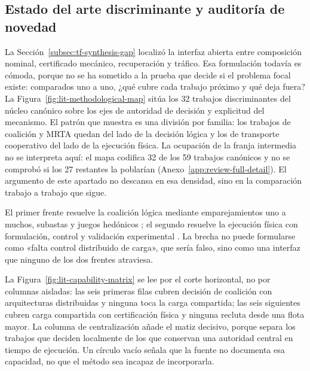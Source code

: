 \subsection{Estado del arte discriminante y auditoría de novedad}
\label{subsec:tf-discriminant}

La Sección~\ref{subsec:tf-synthesis-gap} localizó la interfaz abierta entre composición
nominal, certificado mecánico, recuperación y tráfico. Esa formulación todavía es
cómoda, porque no se ha sometido a la prueba que decide si el problema focal existe:
comparados uno a uno, ¿qué cubre cada trabajo próximo y qué deja fuera? La
Figura~\ref{fig:lit-methodological-map} sitúa los 32 trabajos discriminantes del núcleo
canónico sobre los ejes de autoridad de decisión y explicitud del mecanismo. El patrón
que muestra es una división por familia: los trabajos de coalición y MRTA quedan del
lado de la decisión lógica y los de transporte cooperativo del lado de la ejecución
física. La ocupación de la franja intermedia no se interpreta aquí: el mapa codifica
32 de los 59 trabajos canónicos y no se comprobó si los 27 restantes la poblarían
(Anexo~\ref{app:review-full-detail}). El argumento de este apartado no descansa en esa
densidad, sino en la comparación trabajo a trabajo que sigue.



El primer frente resuelve la coalición lógica mediante emparejamientos uno a muchos,
subastas y juegos hedónicos
\parencite{choiBrunetHow2009CBBA,serviceAdams2011Coalition,chenSun2012Coalition,jangShinTsourdos2018GRAPE,duttaAsaithambi2019Bipartite,dutta2021hedonic,diehlAdams2026Grapes};
el segundo resuelve la ejecución física con formulación, control y validación
experimental
\parencite{alonsomora2017transport,shibata2023event,ebel2024cooperative,fukao2025swarm,tian2025irregular,muhammed2026decentralizedMpc}.
La brecha no puede formularse como «falta control distribuido de carga», que sería
falso, sino como una interfaz que ninguno de los dos frentes atraviesa.



La Figura~\ref{fig:lit-capability-matrix} se lee por el corte horizontal, no por
columnas aisladas: las seis primeras filas cubren decisión de coalición con
arquitecturas distribuidas y ninguna toca la carga compartida; las seis siguientes
cubren carga compartida con certificación física y ninguna recluta desde una flota
mayor. La columna de centralización añade el matiz decisivo, porque separa los trabajos
que deciden localmente de los que conservan una autoridad central en tiempo de
ejecución. Un círculo vacío señala que la fuente no documenta esa capacidad, no que el
método sea incapaz de incorporarla.

